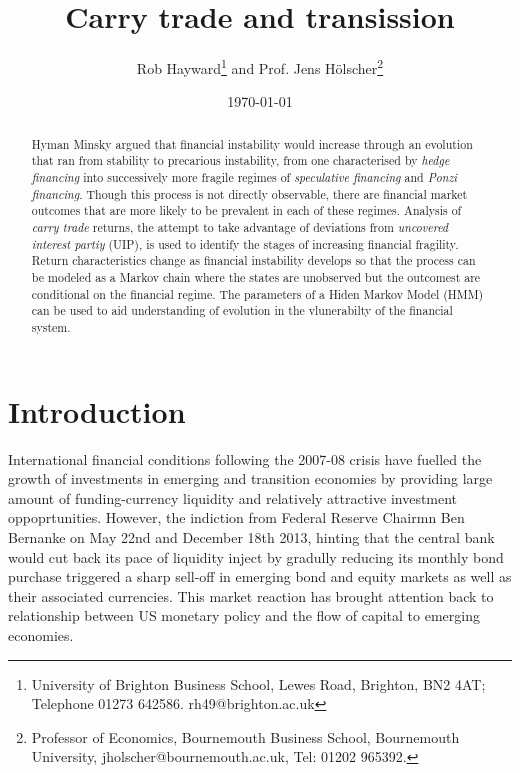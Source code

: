 \documentclass[12pt, a4paper, oneside]{article} %
\begin{document}
\title{Carry trade and transission}
\author{Rob Hayward\footnote{University of Brighton Business School, Lewes Road, Brighton, BN2 4AT; Telephone 01273 642586.  rh49@brighton.ac.uk} and Prof. Jens H\"{o}lscher\footnote{Professor of Economics, Bournemouth Business School, Bournemouth University, jholscher@bournemouth.ac.uk, Tel: 01202 965392.}} 
\date{\today}
\maketitle
\begin{abstract}
Hyman Minsky argued that financial instability would increase through an evolution that ran from stability to precarious instability, from one characterised by \emph{hedge financing} into successively more fragile regimes of \emph{speculative financing} and \emph{Ponzi financing}.  Though this process is not directly observable, there are financial market outcomes that are more likely to be prevalent in each of these regimes.  Analysis of \emph{carry trade} returns, the attempt to take advantage of deviations from \emph{uncovered interest partiy} (UIP), is used to identify the stages of increasing financial fragility.  Return characteristics change as financial instability develops so that the process can be modeled as a Markov chain where the states are unobserved but the outcomest are conditional on  the financial regime.  The parameters of a Hiden Markov Model (HMM) can be used to aid understanding of evolution in the vlunerabilty of the financial system.  %

\end{abstract}

\section{Introduction}
International financial conditions following the 2007-08 crisis have fuelled the growth of investments in emerging and transition economies by providing large amount of funding-currency liquidity and relatively attractive investment oppoprtunities. However, the indiction from Federal Reserve Chairmn Ben Bernanke on May 22nd and December 18th 2013, hinting that the central bank would cut back its pace of liquidity inject by gradully reducing its monthly bond purchase triggered a sharp sell-off in emerging bond and equity markets as well as their associated currencies.  This market reaction has brought attention back to relationship between US monetary policy and the flow of capital to emerging economies.  
\end{document}

